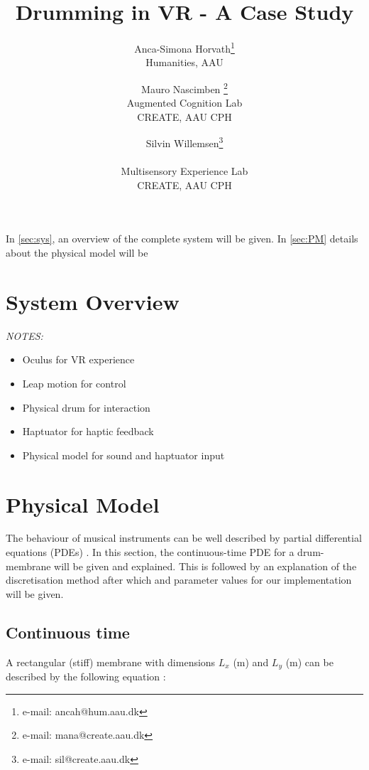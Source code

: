 \documentclass{vgtc}
\title{Drumming in VR - A Case Study}
\author{Anca-Simona Horvath\thanks{e-mail: ancah@hum.aau.dk}\\ %
        \scriptsize Humanities, AAU %
\and Mauro Nascimben \thanks{e-mail: mana@create.aau.dk}\\ %
     \scriptsize Augmented Cognition Lab \\ CREATE, AAU CPH %
\and Silvin Willemsen\thanks{e-mail: sil@create.aau.dk}\\ %
     \parbox{1.4in}{\scriptsize \centering Multisensory Experience Lab \\ CREATE, AAU CPH}}
\begin{document}


\maketitle

In \autoref{sec:sys}, an overview of the complete system will be given. In \autoref{sec:PM} details about the physical model will be 

\section{System Overview} \label{sec:sys}
\textit{NOTES:}
\begin{itemize}
    \item Oculus for VR experience
    \item Leap motion for control
    \item Physical drum for interaction
    \item Haptuator for haptic feedback
    \item Physical model for sound and haptuator input
\end{itemize}

\section{Physical Model}\label{sec:PM}
The behaviour of musical instruments can be well described by partial differential equations (PDEs) \cite{Fletcher1998}. In this section, the continuous-time PDE for a drum-membrane will be given and explained. This is followed by an explanation of the discretisation method after which and parameter values for our implementation will be given. 

\subsection{Continuous time}
A rectangular (stiff) membrane with dimensions $L_x$ (m) and $L_y$ (m) can be described by the following equation \cite{bilbao2009numerical}:
\end{document}
